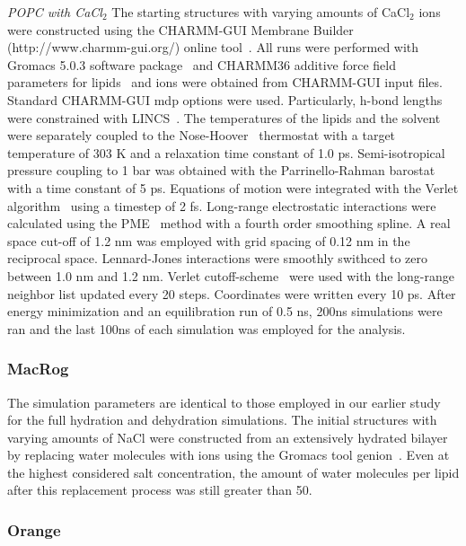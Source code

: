 \documentclass[pre,aps,floatfix,authordate1-4,twocolumn]{revtex4-1}
\begin{document}
{\it POPC with CaCl$_2$}
The starting structures with varying amounts of CaCl$_2$ ions were constructed using the CHARMM-GUI Membrane Builder (http://www.charmm-gui.org/) online tool~\cite{lee15}. 
All runs were performed with Gromacs 5.0.3 software package~\cite{abraham15} and CHARMM36 additive force field parameters for lipids~\cite{klauda10} and ions were obtained from CHARMM-GUI input files. 
Standard CHARMM-GUI mdp options were used. Particularly, h-bond lengths were constrained with LINCS~\cite{hess97,hess07}. The temperatures of the 
lipids and the solvent were separately coupled to the Nose-Hoover~\cite{nose84,hoover85} thermostat with a target temperature of 303 K and a relaxation time constant of 1.0 ps. Semi-isotropical 
pressure coupling to 1 bar was obtained with the Parrinello-Rahman barostat~\cite{parrinello81} with a time constant of 5 ps. Equations of motion were integrated with the Verlet algorithm~\cite{pall13} 
using a timestep of 2 fs. Long-range electrostatic interactions were calculated using the PME~\cite{darden93,essman95} method with a fourth order smoothing spline. A real space cut-off of 1.2 nm 
was employed with grid spacing of 0.12 nm in the reciprocal space. Lennard-Jones interactions were smoothly swithced to zero between 1.0 nm and 1.2 nm. Verlet cutoff-scheme~\cite{pall13}  
were used with the long-range neighbor list updated every 20 steps. Coordinates were written every 10 ps.
After energy minimization and an equilibration run of 0.5 ns, 200ns simulations were ran and the last 100ns of each simulation was employed for the analysis.

\subsubsection{MacRog}
The simulation parameters are identical to those employed in our earlier study~\cite{botan15} for the full 
hydration and dehydration simulations. The initial structures with varying amounts of NaCl were constructed from an 
extensively hydrated bilayer by replacing water molecules with ions using the Gromacs tool genion~\cite{gromacsMANUAL}. Even at the highest 
considered salt concentration, the amount of water molecules per lipid after this replacement process was still greater than 50.

\subsubsection{Orange}
\end{document}
